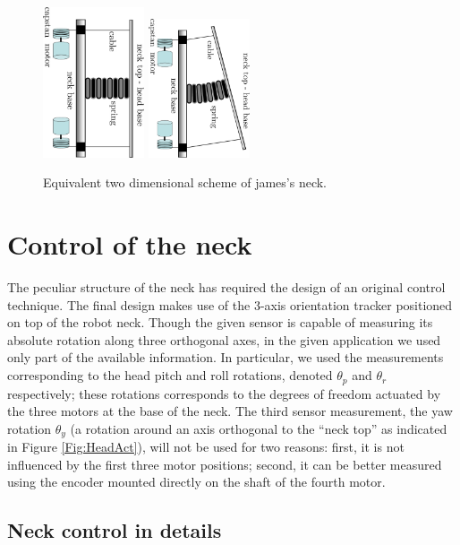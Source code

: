 \documentclass[conference]{IEEEtran}
\numberwithin{equation}{section}
\begin{document}
\begin{figure}[tbp]
\centering
\includegraphics[width=30mm, angle=90]{image/Neck2DSpringCompressed.pdf} 
\includegraphics[width=30mm, angle=90]{image/Neck2DSpringCompressedBent.pdf} 
\caption{Equivalent two dimensional scheme of james's neck.}
\label{Fig:HeadAct2DSpring}
\end{figure}


\section{Control of the neck} \label{Sec:NeckControl}

The peculiar structure of the neck has required the design of an original control technique. The final design makes use of the 3-axis orientation tracker positioned on top of the robot neck. Though the given sensor is capable of measuring its absolute rotation along three orthogonal axes, in the given application we used only part of the available information. In particular, we used the measurements corresponding to the head pitch and roll rotations, denoted $\theta_p$ and $\theta_r$ respectively; these rotations corresponds to the degrees of freedom actuated by the three motors at the base of the neck. The third sensor measurement, the yaw rotation $\theta_y$ (a rotation around an axis orthogonal to the ``neck top'' as indicated in Figure \ref{Fig:HeadAct}), will not be used for two reasons: first, it is not influenced by the first three motor positions; second, it can be better measured using the encoder mounted directly on the shaft of the fourth motor.

\subsection{Neck control in details} \label{Sec:NeckControlInDetails}
\end{document}
